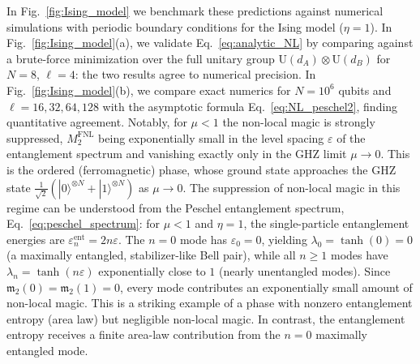 \documentclass[prx,twocolumn,superscriptaddress,aps,10pt, frontmatterverbose, reprint,footinbib,longbibliography=true]{revtex4-2}
\begin{document}
In Fig.~\ref{fig:Ising_model} we benchmark these predictions against numerical simulations with periodic boundary conditions for the Ising model ($\eta=1$).
In Fig.~\ref{fig:Ising_model}(a), we validate Eq.~\eqref{eq:analytic_NL} by comparing against a brute-force minimization over the full unitary group $\mathrm{U}(d_A)\otimes\mathrm{U}(d_B)$ for $N=8$, $\ell=4$: the two results agree to numerical precision.
In Fig.~\ref{fig:Ising_model}(b), we compare exact numerics for $N=10^6$ qubits and $\ell = 16,32,64,128$ with the asymptotic formula Eq.~\eqref{eq:NL_peschel2}, finding quantitative agreement. Notably, for $\mu<1$ the non-local magic is strongly suppressed, $M_2^{\mathrm{FNL}}$ being exponentially small in the level spacing $\varepsilon$ of the entanglement spectrum and vanishing exactly only in the GHZ limit $\mu\to0$. This is the ordered (ferromagnetic) phase, whose ground state approaches the GHZ state $\frac{1}{\sqrt{2}}(|0\rangle^{\otimes N}+|1\rangle^{\otimes N})$ as $\mu\to 0$. The suppression of non-local magic in this regime can be understood from the Peschel entanglement spectrum, Eq.~\eqref{eq:peschel_spectrum}: for $\mu<1$ and $\eta=1$, the single-particle entanglement energies are $\varepsilon_n^{\mathrm{ent}}=2n\varepsilon$. The $n=0$ mode has $\varepsilon_0=0$, yielding $\lambda_0=\tanh(0)=0$ (a maximally entangled, stabilizer-like Bell pair), while all $n\ge 1$ modes have $\lambda_n=\tanh(n\varepsilon)$ exponentially close to $1$ (nearly unentangled modes). Since $\mathfrak{m}_2(0)=\mathfrak{m}_2(1)=0$, every mode contributes an exponentially small amount of non-local magic. This is a striking example of a phase with nonzero entanglement entropy (area law) but negligible  non-local magic. In contrast, the entanglement entropy receives a finite area-law contribution from the $n=0$ maximally entangled mode.
\end{document}
